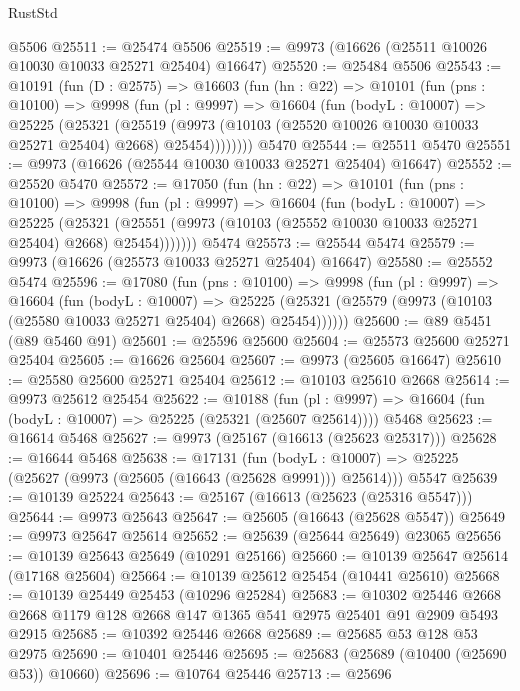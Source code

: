 \begin{lexlean}{RustStd}
\begin{coremodule}
    @5506
@25511 := @25474 @5506
@25519 := @9973 (@16626 (@25511 @10026 @10030 @10033 @25271 @25404) @16647)
@25520 := @25484 @5506
@25543 := @10191
    (fun (D : @2575) =>
    @16603
      (fun (hn : @22) =>
      @10101
        (fun (pns : @10100) =>
        @9998
          (fun (pl : @9997) =>
          @16604
            (fun (bodyL : @10007) =>
            @25225
              (@25321
                (@25519
                  (@9973 (@10103 (@25520 @10026 @10030 @10033 @25271 @25404) @2668) @25454))))))))
    @5470
@25544 := @25511 @5470
@25551 := @9973 (@16626 (@25544 @10030 @10033 @25271 @25404) @16647)
@25552 := @25520 @5470
@25572 := @17050
    (fun (hn : @22) =>
    @10101
      (fun (pns : @10100) =>
      @9998
        (fun (pl : @9997) =>
        @16604
          (fun (bodyL : @10007) =>
          @25225
            (@25321 (@25551 (@9973 (@10103 (@25552 @10030 @10033 @25271 @25404) @2668) @25454)))))))
    @5474
@25573 := @25544 @5474
@25579 := @9973 (@16626 (@25573 @10033 @25271 @25404) @16647)
@25580 := @25552 @5474
@25596 := @17080
    (fun (pns : @10100) =>
    @9998
      (fun (pl : @9997) =>
      @16604
        (fun (bodyL : @10007) =>
        @25225 (@25321 (@25579 (@9973 (@10103 (@25580 @10033 @25271 @25404) @2668) @25454))))))
@25600 := @89 @5451 (@89 @5460 @91)
@25601 := @25596 @25600
@25604 := @25573 @25600 @25271 @25404
@25605 := @16626 @25604
@25607 := @9973 (@25605 @16647)
@25610 := @25580 @25600 @25271 @25404
@25612 := @10103 @25610 @2668
@25614 := @9973 @25612 @25454
@25622 := @10188
    (fun (pl : @9997) => @16604 (fun (bodyL : @10007) => @25225 (@25321 (@25607 @25614))))
    @5468
@25623 := @16614 @5468
@25627 := @9973 (@25167 (@16613 (@25623 @25317)))
@25628 := @16644 @5468
@25638 := @17131
    (fun (bodyL : @10007) => @25225 (@25627 (@9973 (@25605 (@16643 (@25628 @9991))) @25614)))
    @5547
@25639 := @10139 @25224
@25643 := @25167 (@16613 (@25623 (@25316 @5547)))
@25644 := @9973 @25643
@25647 := @25605 (@16643 (@25628 @5547))
@25649 := @9973 @25647 @25614
@25652 := @25639 (@25644 @25649) @23065
@25656 := @10139 @25643 @25649 (@10291 @25166)
@25660 := @10139 @25647 @25614 (@17168 @25604)
@25664 := @10139 @25612 @25454 (@10441 @25610)
@25668 := @10139 @25449 @25453 (@10296 @25284)
@25683 := @10302
    @25446
    @2668
    @2668
    @1179
    @128
    @2668
    @147
    @1365
    @541
    @2975
    @25401
    @91
    @2909
    @5493
    @2915
@25685 := @10392 @25446 @2668
@25689 := @25685 @53 @128 @53 @2975
@25690 := @10401 @25446
@25695 := @25683 (@25689 (@10400 (@25690 @53)) @10660)
@25696 := @10764 @25446
@25713 := @25696

\end{coremodule}
\end{lexlean}
